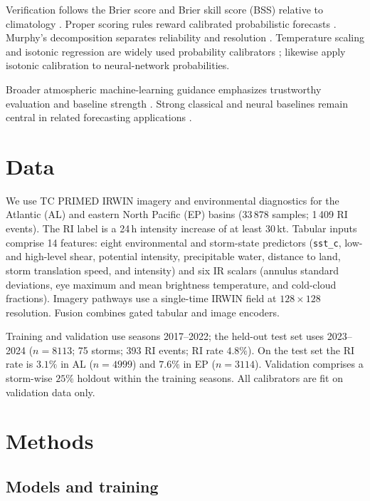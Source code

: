 \documentclass[11pt]{article}
\begin{document}
Verification follows the Brier score and Brier skill score (BSS) relative to climatology \citep{brier1950,hsu1986,wilks2011}. Proper scoring rules reward calibrated probabilistic forecasts \citep{gneiting2007}. Murphy's decomposition separates reliability and resolution \citep{murphy1973}. Temperature scaling and isotonic regression are widely used probability calibrators \citep{guo2017,niculescu2005}; \citet{lagerquist2025} likewise apply isotonic calibration to neural-network probabilities.

Broader atmospheric machine-learning guidance emphasizes trustworthy evaluation and baseline strength \citep{mcgovern2019,mcgovern2019b,ebertuphoff2021,chase2022}. Strong classical and neural baselines remain central in related forecasting applications \citep{gagne2019,rasp2020}.

\section{Data}
\label{sec:data}

We use {TC PRIMED} IRWIN imagery and environmental diagnostics \citep{razin2023,tcprimed} for the Atlantic (AL) and eastern North Pacific (EP) basins (33\,878 samples; 1\,409 RI events). The RI label is a 24\,h intensity increase of at least $30$\,kt. Tabular inputs comprise 14 features: eight environmental and storm-state predictors (\texttt{sst\_c}, low- and high-level shear, potential intensity, precipitable water, distance to land, storm translation speed, and intensity) and six IR scalars (annulus standard deviations, eye maximum and mean brightness temperature, and cold-cloud fractions). Imagery pathways use a single-time IRWIN field at $128\times 128$ resolution. Fusion combines gated tabular and image encoders.

Training and validation use seasons 2017--2022; the held-out test set uses 2023--2024 ($n=8113$; 75 storms; 393 RI events; RI rate $4.8\%$). On the test set the RI rate is $3.1\%$ in AL ($n=4999$) and $7.6\%$ in EP ($n=3114$). Validation comprises a storm-wise $25\%$ holdout within the training seasons. All calibrators are fit on validation data only.

\section{Methods}
\label{sec:methods}

\subsection{Models and training}
\end{document}
